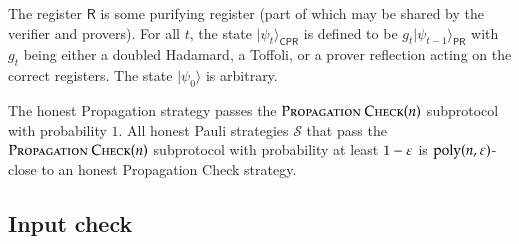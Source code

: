 \documentclass[11pt,letterpaper]{article}
\newcommand{\ket}[1]{|#1\rangle}
\newcommand{\sP}{{\mathsf{P}}}
\newcommand{\sC}{{\mathsf{C}}}
\newcommand{\sR}{{\mathsf{R}}}
\begin{document}
The register $\sR$ is some purifying register (part of which may be shared by the verifier and provers). For all $t$, the state $\ket{\psi_t}_{\sC \sP \sR}$ is defined to be $g_t \ket{\psi_{t-1}}_{\sP \sR}$ with $g_t$ being either a doubled Hadamard, a Toffoli, or a prover reflection acting on the correct registers. The state $\ket{\psi_0}$ is arbitrary.

\begin{theorem}	
\label{thm:prop_check}
The honest Propagation strategy passes the $\textsc{Propagation Check}(n)$ subprotocol with probability $1$. All honest Pauli strategies $\mathcal{S}$ that pass the $\textsc{Propagation Check}(n)$ subprotocol with probability at least $1 - \varepsilon$ is $\operatorname{poly}(n,\varepsilon)$-close to an honest Propagation Check strategy.
\end{theorem}


\subsection{Input check}
\label{sec:input_check}
\end{document}
